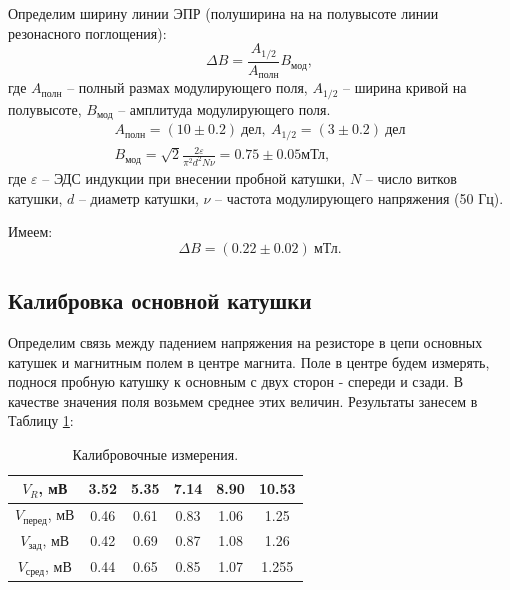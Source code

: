 \documentclass[a4paper, 12pt]{article}
\begin{document}
		Определим ширину линии ЭПР (полуширина на на полувысоте линии резонасного поглощения):
		\begin{equation*}
			\Delta B = \frac{A_{1/2}}{A_{\text{полн}}}B_\text{мод},
		\end{equation*}
		где $A_\text{полн}$ -- полный размах модулирующего поля, $A_{1/2}$ -- ширина кривой на полувысоте, $B_\text{мод}$ -- амплитуда модулирующего поля.
		\begin{equation*}
			\begin{gathered}
				A_\text{полн} = (10 \pm 0.2 ) \ \text{дел}, \ A_{1/2} = (3 \pm 0.2) \ \text{дел} \\
				B_\text{мод} = \sqrt{2} \frac{2\varepsilon}{\pi^2d^2N\nu} = 0.75\pm 0.05 \text{мТл},
			\end{gathered}
		\end{equation*}
		где $\varepsilon$ -- ЭДС индукции при внесении пробной катушки, $N$ -- число витков катушки, $d$ -- диаметр катушки, $\nu$ -- частота модулирующего напряжения (50 Гц).
		
		Имеем:
		\[\boxed{\Delta B = (0.22 \pm 0.02) \ \text{мТл}}.\]
		
		\subsection*{Калибровка основной катушки}
		
		Определим связь между падением напряжения на резисторе в цепи основных катушек и магнитным полем в центре магнита. Поле в центре будем измерять, поднося пробную катушку к основным с двух сторон - спереди и сзади. В качестве значения поля возьмем среднее этих величин. Результаты занесем в Таблицу \ref{table:field}: 
		
		\begin{table}[h]
		\centering
		\label{table:field}
            \begin{tabular}{|c|c|c|c|c|c|}
            \hline
            $V_R$, мВ              & 3.52 & 5.35 & 7.14 & 8.90 & 10.53 \\ \hline
            $V_{\text{перед}}$, мВ & 0.46 & 0.61 & 0.83 & 1.06 & 1.25  \\ \hline
            $V_{\text{зад}}$, мВ   & 0.42 & 0.69 & 0.87 & 1.08 & 1.26  \\ \hline
            $V_{\text{сред}}$, мВ  & 0.44 & 0.65 & 0.85 & 1.07 & 1.255 \\ \hline
            \end{tabular}
        \caption{Калибровочные измерения.}
        \end{table}
        
\end{document}
